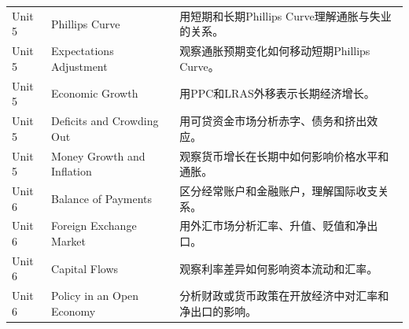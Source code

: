 \documentclass[11pt]{article}
\begin{document}
\begin{longtable}{p{} p{} p{}}
Unit 5 & Phillips Curve & 用短期和长期Phillips Curve理解通胀与失业的关系。 \\
Unit 5 & Expectations Adjustment & 观察通胀预期变化如何移动短期Phillips Curve。 \\
Unit 5 & Economic Growth & 用PPC和LRAS外移表示长期经济增长。 \\
Unit 5 & Deficits and Crowding Out & 用可贷资金市场分析赤字、债务和挤出效应。 \\
Unit 5 & Money Growth and Inflation & 观察货币增长在长期中如何影响价格水平和通胀。 \\

Unit 6 & Balance of Payments & 区分经常账户和金融账户，理解国际收支关系。 \\
Unit 6 & Foreign Exchange Market & 用外汇市场分析汇率、升值、贬值和净出口。 \\
Unit 6 & Capital Flows & 观察利率差异如何影响资本流动和汇率。 \\
Unit 6 & Policy in an Open Economy & 分析财政或货币政策在开放经济中对汇率和净出口的影响。 \\

\bottomrule
\end{longtable}
\end{document}
